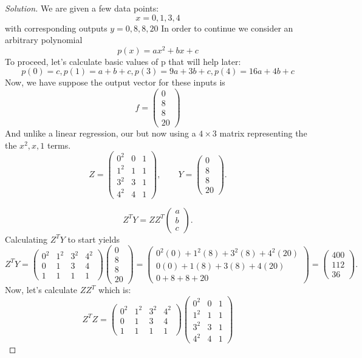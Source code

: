 \documentclass[11pt]{article}
\newcommand{\1}{\mathbf{1}}
\theoremstyle{definition}
\newenvironment{solution}{\begin{proof}[Solution]}{\end{proof}}
\begin{document}
\begin{solution}
We are given a few data points: \[x = {0, 1, 3, 4}\]
with corresponding outputs \(y = {0, 8, 8, 20}\)
In order to continue we consider an arbitrary polynomial
\[p(x) = ax^2 + bx + c\]
To proceed, let's calculate basic values of p that will help later:
\[p(0) = c, p(1) = a + b + c, p(3) = 9a + 3b + c, p(4) = 16a + 4b + c\]
Now, we have suppose the output vector for these inputs is
\[f = \begin{pmatrix}
    0\\
     8\\
     8\\
     20
\end{pmatrix}\]
And unlike a linear regression, our but now using a \(4 \times 3 \) matrix representing the
the \(x^2, x, 1\) terms.
\[
Z =
\begin{pmatrix}
0^2 & 0 & 1 \\
1^2 & 1 & 1 \\
3^2 & 3 & 1 \\
4^2 & 4 & 1
\end{pmatrix},
\qquad
Y =
\begin{pmatrix}
0 \\
8 \\
8 \\
20
\end{pmatrix}.
\]

\[
Z^T Y
=
ZZ^T
\begin{pmatrix}
a \\
b \\
c
\end{pmatrix}.
\]
Calculating \(Z^T Y\) to start yields 
\[
Z^T Y =
\begin{pmatrix}
0^2 & 1^2 & 3^2 & 4^2 \\
0 & 1 & 3 & 4 \\
1 & 1 & 1 & 1
\end{pmatrix}
\begin{pmatrix}
0 \\
8 \\
8 \\
20
\end{pmatrix}
=
\begin{pmatrix}
0^2(0) + 1^2(8) + 3^2(8) + 4^2(20) \\
0(0) + 1(8) + 3(8) + 4(20) \\
0 + 8 + 8 + 20
\end{pmatrix}
=
\begin{pmatrix}
400 \\
112 \\
36
\end{pmatrix}.
\]
Now, let's calculate \(ZZ^T\) which is: 
\[
Z^T Z =
\begin{pmatrix}
0^2 & 1^2 & 3^2 & 4^2 \\
0 & 1 & 3 & 4 \\
1 & 1 & 1 & 1
\end{pmatrix}
\begin{pmatrix}
0^2 & 0 & 1 \\
1^2 & 1 & 1 \\
3^2 & 3 & 1 \\
4^2 & 4 & 1
\end{pmatrix}
\]


\end{solution}
\end{document}
